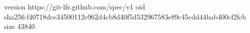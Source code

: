 version https://git-lfs.github.com/spec/v1
oid sha256:f40718dce34500112e962d4cb8d40f5d532967583e89c45cdd44bab400cf2fcb
size 43840
